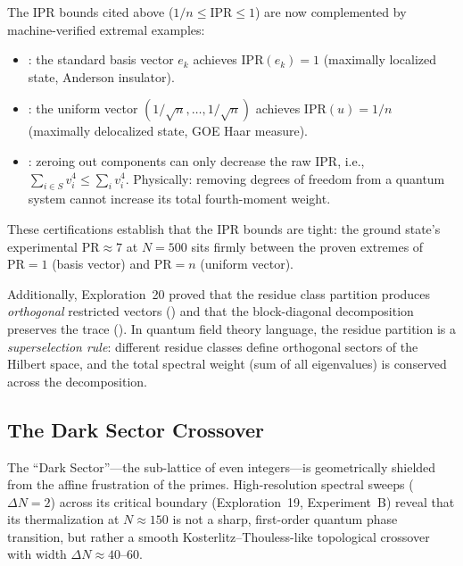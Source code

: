 \documentclass[11pt,a4paper]{article}
\begin{document}
\begin{remark}
The IPR bounds cited above ($1/n \leq \mathrm{IPR} \leq 1$) are
now complemented by machine-verified extremal examples:
\begin{itemize}
  \item {}: the standard basis vector $e_k$ achieves
    $\mathrm{IPR}(e_k) = 1$ (maximally localized state, Anderson insulator).
  \item {}: the uniform vector $(1/\sqrt{n}, \ldots, 1/\sqrt{n})$
    achieves $\mathrm{IPR}(u) = 1/n$ (maximally delocalized state, GOE Haar measure).
  \item {}: zeroing out components can only
    decrease the raw IPR, i.e., $\sum_{i \in S} v_i^4 \leq \sum_i v_i^4$.
    Physically: removing degrees of freedom from a quantum system
    cannot increase its total fourth-moment weight.
\end{itemize}
These certifications establish that the IPR bounds are tight:
the ground state's experimental $\mathrm{PR} \approx 7$ at $N = 500$
sits firmly between the proven extremes of $\mathrm{PR} = 1$
(basis vector) and $\mathrm{PR} = n$ (uniform vector).

Additionally, Exploration~20 proved that the residue class
partition produces \emph{orthogonal} restricted vectors
() and that the block-diagonal
decomposition preserves the trace
().
In quantum field theory language, the residue partition is a
\emph{superselection rule}: different residue classes define
orthogonal sectors of the Hilbert space, and the total spectral
weight (sum of all eigenvalues) is conserved across the
decomposition.
\end{remark}

\subsection{The Dark Sector Crossover}
\label{sec:dark-sector}

The ``Dark Sector''---the sub-lattice of even integers---is geometrically
shielded from the affine frustration of the primes. High-resolution
spectral sweeps ($\Delta N = 2$) across its critical boundary (Exploration~19,
Experiment~B) reveal that its thermalization at $N \approx 150$ is not a
sharp, first-order quantum phase transition, but rather a smooth
Kosterlitz--Thouless-like topological crossover with width
$\Delta N \approx 40$--$60$.
\end{document}
